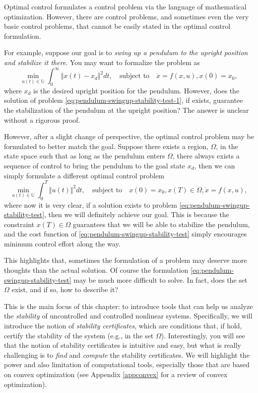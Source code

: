 \documentclass[
]{book}
\theoremstyle{definition}
\theoremstyle{definition}
\theoremstyle{definition}
\theoremstyle{definition}
\theoremstyle{remark}
\begin{document}
Optimal control formulates a control problem via the language of mathematical optimization. However, there are control problems, and sometimes even the very basic control problems, that cannot be easily stated in the optimal control formulation.

For example, suppose our goal is to \emph{swing up a pendulum to the upright position and stabilize it there}. You may want to formalize the problem as
\begin{equation}
\min_{u(t) \in \mathbb{U}} \int_{0}^{\infty} \Vert x(t) - x_d \Vert^2 dt, \quad \text{subject to} \quad \dot{x} = f(x,u), x(0) = x_0,
\label{eq:pendulum-swingup-stability-test-1}
\end{equation}
where \(x_d\) is the desired upright position for the pendulum. However, does the solution of problem \eqref{eq:pendulum-swingup-stability-test-1}, if exists, guarantee the stabilization of the pendulum at the upright position? The answer is unclear without a rigorous proof.

However, after a slight change of perspective, the optimal control problem may be formulated to better match the goal. Suppose there exists a region, \(\Omega\), in the state space such that as long as the pendulum enters \(\Omega\), there always exists a sequence of control to bring the pendulum to the goal state \(x_d\), then we can simply formulate a different optimal control problem
\begin{equation}
\min_{u(t) \in \mathbb{U}} \int_{0}^{T} \Vert u(t) \Vert^2 dt, \quad \text{subject to} \quad x(0)=x_0, x(T) \in \Omega, \dot{x} = f(x,u),
\label{eq:pendulum-swingup-stability-test}
\end{equation}
where now it is very clear, if a solution exists to problem \eqref{eq:pendulum-swingup-stability-test}, then we will definitely achieve our goal. This is because the constraint \(x(T) \in \Omega\) guarantees that we will be able to stabilize the pendulum, and the cost function of \eqref{eq:pendulum-swingup-stability-test} simply encourages minimum control effort along the way.

This highlights that, sometimes the formulation of a problem may deserve more thoughts than the actual solution. Of course the formulation \eqref{eq:pendulum-swingup-stability-test} may be much more difficult to solve. In fact, does the set \(\Omega\) exist, and if so, how to describe it?

This is the main focus of this chapter: to introduce tools that can help us analyze the \emph{stability} of uncontrolled and controlled nonlinear systems. Specifically, we will introduce the notion of \emph{stability certificates}, which are conditions that, if hold, certify the stability of the system (e.g., in the set \(\Omega\)). Interestingly, you will see that the notion of stability certificates is intuitive and easy, but what is really challenging is to \emph{find} and \emph{compute} the stability certificates. We will highlight the power and also limitation of computational tools, especially those that are based on convex optimization (see Appendix \ref{appconvex} for a review of convex optimization).
\end{document}
